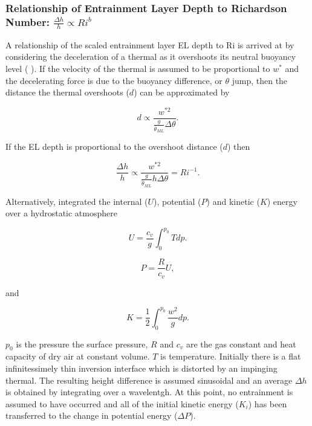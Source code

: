 \subsubsection{Relationship of Entrainment Layer Depth to Richardson Number: $\frac{\Delta h}{h} \propto Ri ^{b}$}

A relationship of the scaled entrainment layer \acs{EL} depth to \acs{Ri} is arrived at by considering the deceleration of a thermal
as it overshoots its neutral buoyancy level (\citeauthor{StullNelEl} \citeyear{StullNelEl}).  If the velocity of the thermal is assumed to be
proportional to $w^{*}$ and the decelerating force is due to the buoyancy difference, or $\theta$ jump, then the distance the thermal overshoots
($d$) can be approximated by

\begin{equation}
d \propto \frac{w^{*2}}{\frac{g}{\overline{\theta}_{ML}} \Delta \theta}. 
\end{equation} 

If the \acs{EL} depth is proportional to the overshoot distance ($d$) then

\begin{equation}
\frac{\Delta h}{h} \propto \frac{w^{*2}}{\frac{g}{\overline{\theta}_{ML}} h \Delta \theta} = Ri^{-1}. 
\end{equation} 

Alternatively, \citeauthor{Boers89} \citeyear{Boers89} integrated the internal ($U$), potential ($P$) and kinetic ($K$) energy over a hydrostatic atmosphere

\begin{equation}
U = \frac{c_{v}}{g}\int^{p_{0}}_{0}Tdp.
\end{equation}

\begin{equation}
P = \frac{R}{c_{v}}U,
\end{equation}

and

\begin{equation}
K = \frac{1}{2} \int^{p_{0}}_{0}\frac{w^{2}}{g}dp.
\end{equation}

$p_{0}$ is the pressure the surface pressure, $R$ and $c_{v}$ are the gas constant and heat capacity of dry air at constant volume.
$T$ is temperature.  Initially there is a flat infinitessimely thin inversion interface  which is distorted by an
impinging thermal.  The resulting height difference is assumed sinusoidal and an average $\Delta h$ is obtained by integrating 
over a wavelentgh.  At this point, no entrainment is assumed to have occurred and all of the initial kinetic energy ($K_{i}$) has been transferred to the change in potential energy ($\Delta P$).


